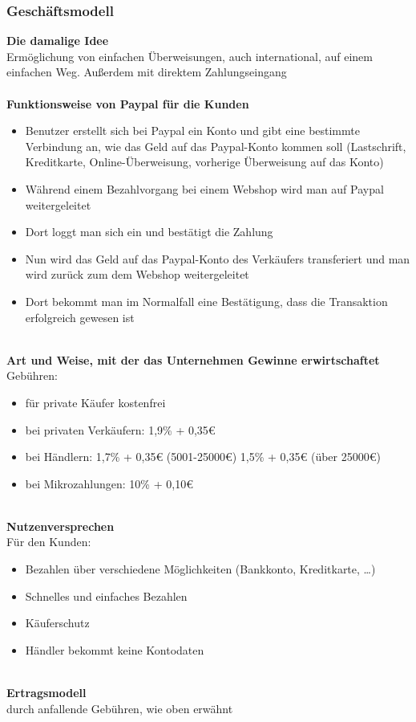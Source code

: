 \begin{itemize}
\subsubsection{Geschäftsmodell}
\textbf{Die damalige Idee}\\
Ermöglichung von einfachen Überweisungen, auch international, auf einem einfachen Weg. Außerdem mit direktem Zahlungseingang\\
\\
\textbf{Funktionsweise von Paypal für die Kunden}\\
\begin{itemize}
\item Benutzer erstellt sich bei Paypal ein Konto und gibt eine bestimmte Verbindung an, wie das Geld auf das Paypal-Konto kommen soll (Lastschrift, Kreditkarte, Online-Überweisung, vorherige Überweisung auf das Konto)
\item Während einem Bezahlvorgang bei einem Webshop wird man auf Paypal weitergeleitet
\item Dort loggt man sich ein und bestätigt die Zahlung
\item Nun wird das Geld auf das Paypal-Konto des Verkäufers transferiert und man wird zurück zum dem Webshop weitergeleitet
\item Dort bekommt man im Normalfall eine Bestätigung, dass die Transaktion erfolgreich gewesen ist
\end{itemize}
\\
\textbf{Art und Weise, mit der das Unternehmen Gewinne erwirtschaftet}\\
Gebühren:\\ 
\begin{itemize}
\item für private Käufer kostenfrei
\item bei privaten Verkäufern: 1,9\% + 0,35\euro{}
\item bei Händlern: 1,7\% + 0,35\euro{} (5001-25000\euro{}) 1,5\% + 0,35\euro{} (über 25000\euro{})
\item bei Mikrozahlungen: 10\% + 0,10\euro{}
\end{itemize}
\\
\textbf{Nutzenversprechen}\\
Für den Kunden:\\
\begin{itemize}
\item Bezahlen über verschiedene Möglichkeiten (Bankkonto, Kreditkarte, …)
\item Schnelles und einfaches Bezahlen
\item Käuferschutz
\item Händler bekommt keine Kontodaten
\end{itemize}
\\
\textbf{Ertragsmodell}\\
durch anfallende Gebühren, wie oben erwähnt\\

\end{itemize}
